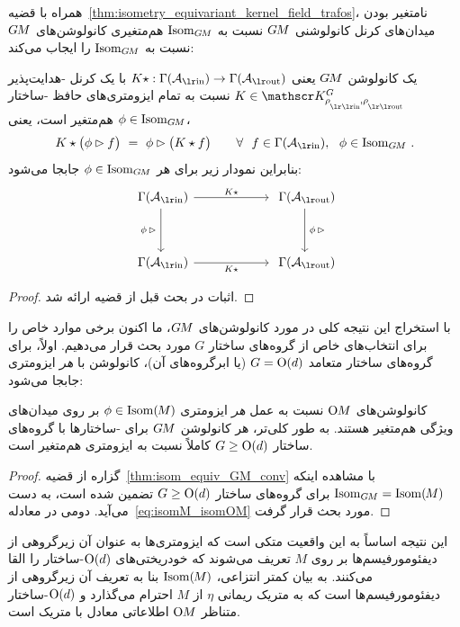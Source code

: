 همراه با قضیه~\ref{thm:isometry_equivariant_kernel_field_trafos}، نامتغیر بودن میدان‌های کرنل کانولوشنی $G\mkern-1.4muM$ نسبت به $\operatorname{Isom}_{G\mkern-1.4muM}$ هم‌متغیری کانولوشن‌های $G\mkern-1.4muM$ نسبت به $\operatorname{Isom}_{G\mkern-1.4muM}$ را ایجاب می‌کند:
\begin{thm}
\label{thm:isom_equiv_GM_conv}
    یک کانولوشن $G\mkern-1.4muM$ یعنی $K\star: \Gamma(\Ain)\to \Gamma(\Aout)$ با یک کرنل -هدایت‌پذیر $K\in\KG$ نسبت به تمام ایزومتری‌های حافظ -ساختار $\phi \in \operatorname{Isom}_{G\mkern-1.4muM}$ هم‌متغیر است، یعنی،
    \begin{align}
        K \star \big( \phi \rhd f \big) \ =\ 
        \phi \rhd \big( K \star  f \big)
        \qquad \forall\ \ f\in\Gamma(\Ain), \ \ \phi\in \IsomGM \,.
    \end{align}
    بنابراین نمودار زیر برای هر $\phi \in \operatorname{Isom}_{G\mkern-1.4muM}$ جابجا می‌شود:
    \begin{equation}
    \begin{tikzcd}[column sep=60pt, row sep=35, font=\normalsize]
        \Gamma(\Ain)
            \arrow[r, "K\star"]
            \arrow[d, "\phi\,\rhd\,"']
        &
        \Gamma(\Aout)
            \arrow[d, "\,\phi\,\rhd"]
        \\
        \Gamma(\Ain)
            \arrow[r, "K\star"']
        &
        \Gamma(\Aout)
    \end{tikzcd}
    \end{equation}
\end{thm}
\begin{proof}
    اثبات در بحث قبل از قضیه ارائه شد.
\end{proof}



با استخراج این نتیجه کلی در مورد کانولوشن‌های $G\mkern-1.4muM$، ما اکنون برخی موارد خاص را برای انتخاب‌های خاص از گروه‌های ساختار $G$ مورد بحث قرار می‌دهیم.
اولاً، برای گروه‌های ساختار متعامد $G=\operatorname{O}(d)$ (یا ابرگروه‌های آن)، کانولوشن با \emph{هر} ایزومتری جابجا می‌شود:
\begin{thm}
\label{thm:Od_equiv_OM_conv}
    کانولوشن‌های $\operatorname{O}\mkern-3.6muM$ نسبت به عمل \emph{هر} ایزومتری $\phi \in \operatorname{Isom}(\mkern-1.5mu M \mkern-.5mu)$ بر روی میدان‌های ویژگی هم‌متغیر هستند.
    به طور کلی‌تر، هر کانولوشن $G\mkern-1.4muM$ برای \lr{G}-ساختارها با گروه‌های ساختار $G\geq\operatorname{O}(d)$ کاملاً نسبت به ایزومتری هم‌متغیر است.
\end{thm}
\begin{proof}
    گزاره از قضیه~\eqref{thm:isom_equiv_GM_conv} با مشاهده اینکه $\operatorname{Isom}_{G\mkern-1.4muM} = \operatorname{Isom}(\mkern-1.5mu M \mkern-.5mu)$ برای گروه‌های ساختار $G \geq \operatorname{O}(d)$ تضمین شده است، به دست می‌آید.
    دومی در معادله~\eqref{eq:isomM_isomOM} مورد بحث قرار گرفت.
\end{proof}
این نتیجه اساساً به این واقعیت متکی است که ایزومتری‌ها به عنوان آن زیرگروهی از دیفئومورفیسم‌ها بر روی $M$ تعریف می‌شوند که خودریختی‌های $\operatorname{O}(d)$-ساختار را القا می‌کنند.
به بیان کمتر انتزاعی، $\operatorname{Isom}(\mkern-1.5mu M \mkern-.5mu)$ بنا به تعریف آن زیرگروهی از دیفئومورفیسم‌ها است که به متریک ریمانی $\eta$ از $M$ احترام می‌گذارد و $\operatorname{O}(d)$-ساختار متناظر $\operatorname{O}\mkern-3.6muM$ اطلاعاتی معادل با متریک است.



